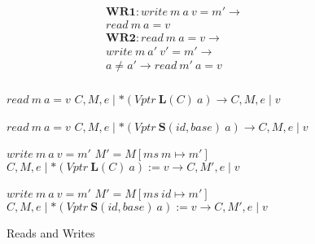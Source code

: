 \documentclass{article}
\begin{document}
\begin{figure}

  \begin{minipage}[t]{0.3\textwidth}
    \[\begin{aligned}
    \mathbf{WR1} : \mathit{write} ~ m ~ a ~ v = m' \rightarrow & \\
    \mathit{read} ~ m ~ a = v & \\[0.75em]
    \mathbf{WR2} : \mathit{read} ~ m ~ a = v \rightarrow & \\
    \mathit{write} ~ m ~ a' ~ v' = m' \rightarrow & \\
    a \not = a' \rightarrow \mathit{read} ~ m' ~ a = v & \\[0.75em]
    \end{aligned}\]
  \end{minipage}
  \begin{minipage}[t]{0.69\textwidth}
                {\(\mathit{read} ~ m ~ a = v\)}
                {\(C,M,e \mid *(\mathit{Vptr} ~ \mathbf{L}(C) ~ a)
                  \longrightarrow C,M,e \mid v\)}

                {\(\mathit{read} ~ m ~ a = v\)}
                {\(C,M,e \mid *(\mathit{Vptr} ~ \mathbf{S}(id, \mathit{base}) ~ a)
                  \longrightarrow C,M,e \mid v\)}

                  {\(\mathit{write} ~ m ~ a ~ v = m'\)}
                  {\(M' = M[ms ~ m \mapsto m']\)}
                  {\(C,M,e \mid *(\mathit{Vptr} ~ \mathbf{L}(C) ~ a) := v
                    \longrightarrow C,M',e \mid v\)}

                  {\(\mathit{write} ~ m ~ a ~ v = m'\)}
                  {\(M' = M[ms ~ id \mapsto m']\)}
                  {\(C,M,e \mid *(\mathit{Vptr} ~ \mathbf{S}(id, \mathit{base}) ~ a) := v
                    \longrightarrow C,M',e \mid v\)}
  \end{minipage}

  \caption{Reads and Writes}
  \label{subfig:rwstep}
\end{figure}
\end{document}
